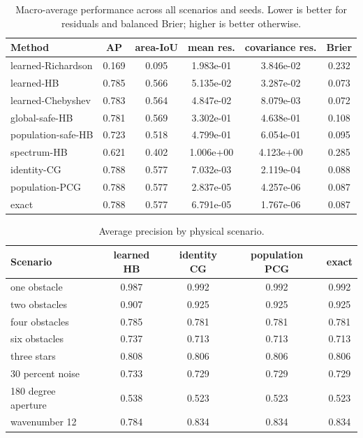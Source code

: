 \documentclass[10pt]{article}
\begin{document}
\begin{table}[t]
\centering\small
\caption{Macro-average performance across all scenarios and seeds.  Lower is
better for residuals and balanced Brier; higher is better otherwise.}
\begin{tabular}{lccccc}
\toprule
Method & AP & area-IoU & mean res. & covariance res. & Brier\\
\midrule
learned-Richardson & 0.169 & 0.095 & 1.983e-01 & 3.846e-02 & 0.232 \\
learned-HB & 0.785 & 0.566 & 5.135e-02 & 3.287e-02 & 0.073 \\
learned-Chebyshev & 0.783 & 0.564 & 4.847e-02 & 8.079e-03 & 0.072 \\
global-safe-HB & 0.781 & 0.569 & 3.302e-01 & 4.638e-01 & 0.108 \\
population-safe-HB & 0.723 & 0.518 & 4.799e-01 & 6.054e-01 & 0.095 \\
spectrum-HB & 0.621 & 0.402 & 1.006e+00 & 4.123e+00 & 0.285 \\
identity-CG & 0.788 & 0.577 & 7.032e-03 & 2.119e-04 & 0.088 \\
population-PCG & 0.788 & 0.577 & 2.837e-05 & 4.257e-06 & 0.087 \\
exact & 0.788 & 0.577 & 6.791e-05 & 1.767e-06 & 0.087 \\
\bottomrule
\end{tabular}
\end{table}

\begin{table}[t]
\centering\scriptsize
\caption{Average precision by physical scenario.}
\begin{tabular}{lcccc}
\toprule
Scenario & learned HB & identity CG & population PCG & exact\\
\midrule
one obstacle & 0.987 & 0.992 & 0.992 & 0.992 \\
two obstacles & 0.907 & 0.925 & 0.925 & 0.925 \\
four obstacles & 0.785 & 0.781 & 0.781 & 0.781 \\
six obstacles & 0.737 & 0.713 & 0.713 & 0.713 \\
three stars & 0.808 & 0.806 & 0.806 & 0.806 \\
30 percent noise & 0.733 & 0.729 & 0.729 & 0.729 \\
180 degree aperture & 0.538 & 0.523 & 0.523 & 0.523 \\
wavenumber 12 & 0.784 & 0.834 & 0.834 & 0.834 \\
\bottomrule
\end{tabular}
\end{table}
\end{document}
